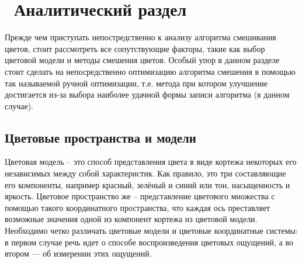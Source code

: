 \chapter{ Аналитический раздел}
\label{cha:analysis}

Прежде чем приступать непостредственно к анализу алгоритма смешивания цветов, стоит рассмотреть все сопутствующие факторы, такие как выбор цветовой модели и методы смешения цветов. Особый упор в данном разделе стоит сделать на непосредственно оптимизацию алгоритма смешения в помощью так называемой ручной оптимизации, т.е. метода при котором улучшение достигается из-за выбора  наиболее удачной формы записи алгоритма (в данном случае).

\section {Цветовые пространства и модели}
Цветовая модель -- это способ представления цвета в виде кортежа некоторых его независимых между собой характеристик. Как правило, это три составляющие его компоненты, например красный, зелёный и синий или тон, насыщенность и яркость. Цветовое пространство же -- представление цветового множества с помощью такого координатного пространства, что каждая ось преставляет возможные значения одной из компонент кортежа из цветовой модели. Необходимо четко различать цветовые модели и цветовые координатные системы: в первом случае речь идет о способе воспроизведения цветовых ощущений, а во втором — об измерении этих ощущений.

